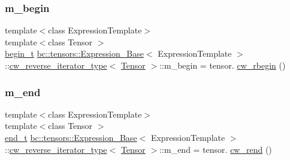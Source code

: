 \subsubsection{\texorpdfstring{m\+\_\+begin}{m\_begin}}
{\footnotesize\ttfamily template$<$class Expression\+Template$>$ \\
template$<$class Tensor $>$ \\
\hyperlink{structbc_1_1tensors_1_1Expression__Base_1_1cw__reverse__iterator__type_a63231d68ab487d4d24996e7a538fc427}{begin\+\_\+t} \hyperlink{classbc_1_1tensors_1_1Expression__Base}{bc\+::tensors\+::\+Expression\+\_\+\+Base}$<$ Expression\+Template $>$\+::\hyperlink{structbc_1_1tensors_1_1Expression__Base_1_1cw__reverse__iterator__type}{cw\+\_\+reverse\+\_\+iterator\+\_\+type}$<$ \hyperlink{namespacebc_a659391e47ab612be3ba6c18cf9c89159}{Tensor} $>$\+::m\+\_\+begin = tensor. \hyperlink{classbc_1_1tensors_1_1Expression__Base_a82c194b3f8c9e934caf0ac5e5380042a}{cw\+\_\+rbegin} ()}

\mbox{\label{structbc_1_1tensors_1_1Expression__Base_1_1cw__reverse__iterator__type_a2bae8ccab838df6ec27e701f9e28e0be}} 
\subsubsection{\texorpdfstring{m\+\_\+end}{m\_end}}
{\footnotesize\ttfamily template$<$class Expression\+Template$>$ \\
template$<$class Tensor $>$ \\
\hyperlink{structbc_1_1tensors_1_1Expression__Base_1_1cw__reverse__iterator__type_aff1a4ff5ef38cc11c629243ef23d6155}{end\+\_\+t} \hyperlink{classbc_1_1tensors_1_1Expression__Base}{bc\+::tensors\+::\+Expression\+\_\+\+Base}$<$ Expression\+Template $>$\+::\hyperlink{structbc_1_1tensors_1_1Expression__Base_1_1cw__reverse__iterator__type}{cw\+\_\+reverse\+\_\+iterator\+\_\+type}$<$ \hyperlink{namespacebc_a659391e47ab612be3ba6c18cf9c89159}{Tensor} $>$\+::m\+\_\+end = tensor. \hyperlink{classbc_1_1tensors_1_1Expression__Base_acd8f45445f2245cf879680274cc89d7f}{cw\+\_\+rend} ()}

